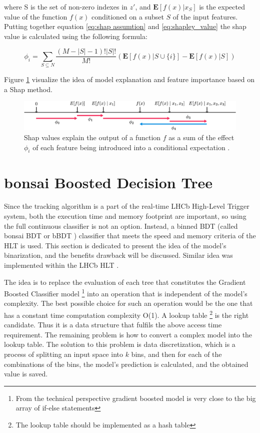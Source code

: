 where S is the set of non-zero indexes in $z'$, and $\mathbf{E}[f(x)|x_S]$ is the expected value of the function $f(x)$ conditioned on a subset $S$ of the input features. Putting together equation \ref{eq:shap assumtion} and \ref{eq:shapley_value} the shap value is calculated using the following formula:

\begin{equation}
        \phi_{i} = \sum_{S \subseteq N} \frac{(M-|S|-1)!|S|!}{M!}(\mathbf{E}[f(x)| S\cup \{i\}] - \mathbf{E}[f(x)|S])
\end{equation}

Figure \ref{fig:shap_exp} visualize the idea of model explanation and feature importance based on a Shap method. 


\begin{figure}[!h]
\centering
\includegraphics{figures/shap_explanation.png}
\caption{Shap values explain the output of a function $f$ as a sum of the effect $\phi_i$ of each feature being introduced into a conditional expectation \cite{shap2}. 
\label{fig:shap_exp}}
\end{figure} 


\section{bonsai Boosted Decision Tree}
\label{sec:bbdt}
Since the tracking algorithm is a part of the real-time LHCb High-Level Trigger system, both the execution time and memory footprint are important, so using the full continuous classifier is not an option. Instead, a binned BDT (called bonsai BDT or bBDT ) classifier that meets the speed and memory criteria of the HLT is used. This section is dedicated to present the idea of the model's binarization, and the benefits drawback will be discussed. Similar idea was implemented within the LHCb HLT \cite{bbdt}.


The idea is to replace the evaluation of each tree that constitutes the Gradient Boosted Classifier model \footnote{From the technical perspective gradient boosted model is very close to the big array of if-else statements} into an operation that is independent of the model's complexity. The best possible choice for such an operation would be the one that has a constant time computation complexity O(1).  A lookup table \footnote{The lookup table should be implemented as a hash table} is the right candidate. Thus it is a data structure that fulfils the above access time requirement. The remaining problem is how to convert a complex model into the lookup table.  The solution to this problem is data discretization, which is a process of splitting an input space into $k$ bins, and then for each of the combinations of the bins, the model's prediction is calculated, and the obtained value is saved. 

